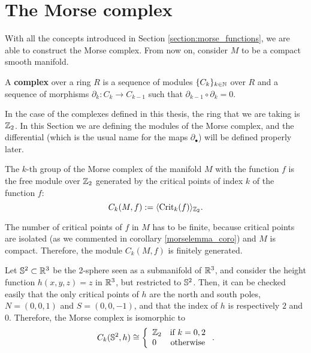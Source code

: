 \section{The Morse complex} \label{section:morse_complex}

With all the concepts introduced in Section \ref{section:morse_functions}, we are able to construct the Morse complex. From now on, consider $M$ to be a compact smooth manifold.

\begin{deff}
A {\bf complex} over a ring $R$ is a sequence of modules $\{ C_k \}_{k \in \mathbb{N}}$ over $R$ and a sequence of morphisms $\partial_k : C_k \rightarrow C_{k-1}$ such that $\partial_{k-1} \circ \partial_k = 0$.
\end{deff}

In the case of the complexes defined in this thesis, the ring that we are taking is $\mathbb{Z}_2$. In this Section we are defining the modules of the Morse complex, and the differential (which is the usual name for the maps $\partial_{\bullet}$) will be defined properly later.

\begin{deff}
The $k$-th group of the Morse complex of the manifold $M$ with the function $f$ is the free module over $\mathbb{Z}_2$ generated by the critical points of index $k$ of the function $f$:
\begin{displaymath}
C_k(M,f) := \langle \mathrm{Crit}_k(f) \rangle_{\mathbb{Z}_2} .
\end{displaymath}
\end{deff}

\begin{rmrk} \label{rmrk:finitecritial}
The number of critical points of $f$ in $M$ has to be finite, because critical points are isolated (as we commented in corollary \ref{morselemma_coro}) and $M$ is compact. Therefore, the module $C_k(M,f)$ is finitely generated.
\end{rmrk}

\begin{exmpl}
Let $\mathbb{S}^2 \subset \mathbb{R}^3$ be the 2-sphere seen as a submanifold of $\mathbb{R}^3$, and consider the height function $h(x,y,z) = z$ in $\mathbb{R}^3$, but restricted to $\mathbb{S}^2$. Then, it can be checked easily that the only critical points of $h$ are the north and south poles, $N = (0,0,1)$ and $S = (0,0,-1)$, and that the index of $h$ is respectively $2$ and $0$. Therefore, the Morse complex is isomorphic to
\[C_k(\mathbb{S}^2,h) \cong \left\{ \begin{array}{lc} \mathbb{Z}_2 & \text{if } k = 0, 2 \\ 0 & \text{otherwise} \end{array}\right. .\]
\end{exmpl}

